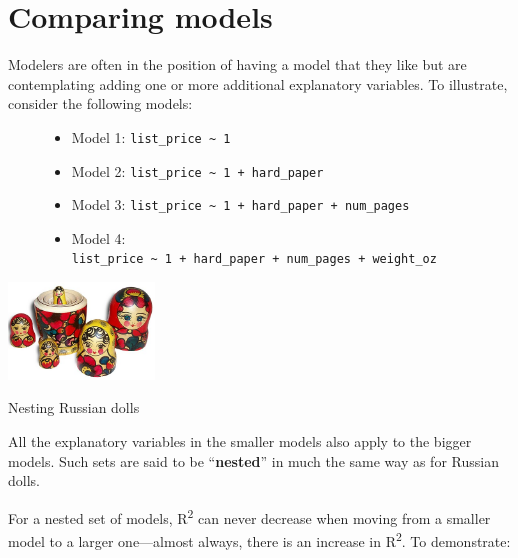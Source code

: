 \documentclass[
  letterpaper,
  DIV=11,
  numbers=noendperiod,
  oneside]{scrreprt}
\providecommand{\tightlist}{%
  \setlength{\itemsep}{0pt}\setlength{\parskip}{0pt}}\usepackage{longtable,booktabs,array}
\begin{document}
\hypertarget{sec-partial-R2}{%
\section{Comparing models}\label{sec-partial-R2}}

Modelers are often in the position of having a model that they like but
are contemplating adding one or more additional explanatory variables.
To illustrate, consider the following models:

\begin{figure}

\begin{itemize}
\tightlist
\item
  Model 1: \texttt{list\_price\ \textasciitilde{}\ 1}
\item
  Model 2: \texttt{list\_price\ \textasciitilde{}\ 1\ +\ hard\_paper}
\item
  Model 3:
  \texttt{list\_price\ \textasciitilde{}\ 1\ +\ hard\_paper\ +\ num\_pages}
\item
  Model 4:
  \texttt{list\_price\ \textasciitilde{}\ 1\ +\ hard\_paper\ +\ num\_pages\ +\ weight\_oz}
\end{itemize}

\end{figure}

\begin{marginfigure}

{\centering \includegraphics[width=1.53in,height=\textheight]{./www/Russian-Matroshka_no_bg.jpeg}

}

\caption{\label{fig-russian-dolls}Nesting Russian dolls}

\end{marginfigure}

All the explanatory variables in the smaller models also apply to the
bigger models. Such sets are said to be ``\textbf{nested}'' in much the
same way as for Russian dolls.

For a nested set of models, R\textsuperscript{2} can never decrease when
moving from a smaller model to a larger one---almost always, there is an
increase in R\textsuperscript{2}. To demonstrate:
\end{document}
